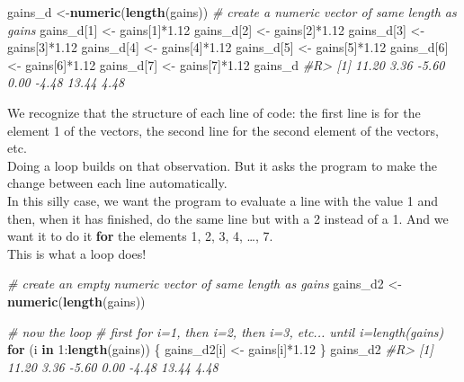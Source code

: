 \documentclass[]{book}
\newenvironment{Shaded}{}{}
\newcommand{\CommentTok}[1]{\textcolor[rgb]{0.38,0.63,0.69}{\textit{#1}}}
\newcommand{\ControlFlowTok}[1]{\textcolor[rgb]{0.00,0.44,0.13}{\textbf{#1}}}
\newcommand{\DecValTok}[1]{\textcolor[rgb]{0.25,0.63,0.44}{#1}}
\newcommand{\FloatTok}[1]{\textcolor[rgb]{0.25,0.63,0.44}{#1}}
\newcommand{\KeywordTok}[1]{\textcolor[rgb]{0.00,0.44,0.13}{\textbf{#1}}}
\newcommand{\NormalTok}[1]{#1}
\newcommand{\OperatorTok}[1]{\textcolor[rgb]{0.40,0.40,0.40}{#1}}
\newcommand{\StringTok}[1]{\textcolor[rgb]{0.25,0.44,0.63}{#1}}
\theoremstyle{definition}
\theoremstyle{definition}
\theoremstyle{definition}
\theoremstyle{remark}
\begin{document}
\begin{Shaded}
\begin{Highlighting}[]
\NormalTok{gains_d <-}\KeywordTok{numeric}\NormalTok{(}\KeywordTok{length}\NormalTok{(gains)) }\CommentTok{# create a numeric vector of same length as gains}
\NormalTok{gains_d[}\DecValTok{1}\NormalTok{] <-}\StringTok{ }\NormalTok{gains[}\DecValTok{1}\NormalTok{]}\OperatorTok{*}\FloatTok{1.12} 
\NormalTok{gains_d[}\DecValTok{2}\NormalTok{] <-}\StringTok{ }\NormalTok{gains[}\DecValTok{2}\NormalTok{]}\OperatorTok{*}\FloatTok{1.12}
\NormalTok{gains_d[}\DecValTok{3}\NormalTok{] <-}\StringTok{ }\NormalTok{gains[}\DecValTok{3}\NormalTok{]}\OperatorTok{*}\FloatTok{1.12}
\NormalTok{gains_d[}\DecValTok{4}\NormalTok{] <-}\StringTok{ }\NormalTok{gains[}\DecValTok{4}\NormalTok{]}\OperatorTok{*}\FloatTok{1.12}
\NormalTok{gains_d[}\DecValTok{5}\NormalTok{] <-}\StringTok{ }\NormalTok{gains[}\DecValTok{5}\NormalTok{]}\OperatorTok{*}\FloatTok{1.12}
\NormalTok{gains_d[}\DecValTok{6}\NormalTok{] <-}\StringTok{ }\NormalTok{gains[}\DecValTok{6}\NormalTok{]}\OperatorTok{*}\FloatTok{1.12}
\NormalTok{gains_d[}\DecValTok{7}\NormalTok{] <-}\StringTok{ }\NormalTok{gains[}\DecValTok{7}\NormalTok{]}\OperatorTok{*}\FloatTok{1.12}
\NormalTok{gains_d}
\CommentTok{#R> [1] 11.20  3.36 -5.60  0.00 -4.48 13.44  4.48}
\end{Highlighting}
\end{Shaded}

We recognize that the structure of each line of code: the first line is
for the element 1 of the vectors, the second line for the second element
of the vectors, etc.\\
Doing a loop builds on that observation. But it asks the program to make
the change between each line automatically.\\
In this silly case, we want the program to evaluate a line with the
value 1 and then, when it has finished, do the same line but with a 2
instead of a 1. And we want it to do it \textbf{for} the elements 1, 2,
3, 4, \ldots, 7.\\
This is what a loop does!

\begin{Shaded}
\begin{Highlighting}[]
\CommentTok{# create an empty numeric vector of same length as gains}
\NormalTok{gains_d2 <-}\KeywordTok{numeric}\NormalTok{(}\KeywordTok{length}\NormalTok{(gains)) }

\CommentTok{# now the loop}
\CommentTok{# first for i=1, then i=2, then i=3, etc... until i=length(gains)}
\ControlFlowTok{for}\NormalTok{ (i }\ControlFlowTok{in} \DecValTok{1}\OperatorTok{:}\KeywordTok{length}\NormalTok{(gains)) \{  }
\NormalTok{  gains_d2[i] <-}\StringTok{ }\NormalTok{gains[i]}\OperatorTok{*}\FloatTok{1.12} 
\NormalTok{\}}
\NormalTok{gains_d2}
\CommentTok{#R> [1] 11.20  3.36 -5.60  0.00 -4.48 13.44  4.48}
\end{Highlighting}
\end{Shaded}
\end{document}
